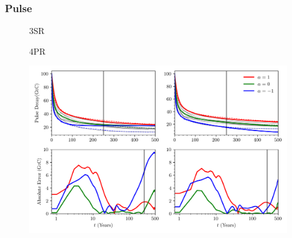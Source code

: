 \documentclass[11pt, a4paper, pdftex, twoside, dvipsnames]{article}
\begin{document}
 \subsubsection{Pulse}
 \lipsum[1]
 \lipsum[1]
\begin{figure}[b]
\noindent %
\begin{minipage}{0.5\textwidth}
	\noindent
	\centering
	\hspace{3em}\small{\textsc{3SR}}
\end{minipage}%
\begin{minipage}{0.5\textwidth}
	\noindent
	\centering
	\small{\textsc{4PR}}
\end{minipage}
    \includegraphics[width=\textwidth]{fig/simulations_pulse_decay.png}
    \caption{
 \lipsum[1][1-5]
     }
    \label{fig:pulse_error}
\end{figure}


\end{document}
